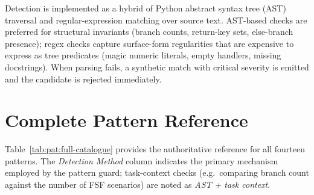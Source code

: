 Detection is implemented as a hybrid of Python abstract syntax tree (AST)
traversal and regular-expression matching over source text.  AST-based checks
are preferred for structural invariants (branch counts, return-key sets,
else-branch presence); regex checks capture surface-form regularities that are
expensive to express as tree predicates (magic numeric literals, empty handlers,
missing docstrings).  When parsing fails, a synthetic  match with
critical severity is emitted and the candidate is rejected immediately.

\section{Complete Pattern Reference}
\label{sec:pat:reference}

Table~\ref{tab:pat:full-catalogue} provides the authoritative reference for
all fourteen patterns.  The \emph{Detection Method} column indicates the
primary mechanism employed by the pattern guard; task-context checks (e.g.\
comparing branch count against the number of FSF scenarios) are noted as
\emph{AST + task context}.

